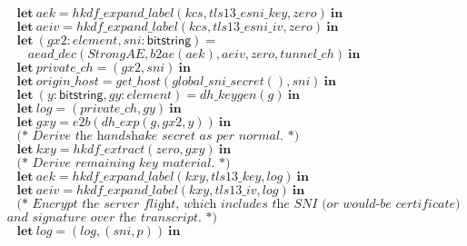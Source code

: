 \documentclass{article}
\theoremstyle{definition}
\newcommand{\kwl}[1]{\mathbf{#1}}
\newcommand{\kwt}[1]{\mathsf{#1}}
\newcommand{\var}[1]{\mathit{#1}}
\theoremstyle{definition}
\begin{document}
\begin{tabbing}
$\ \ \ \ \ \kwl{let}\ \var{aek} = \var{hkdf{\_}expand{\_}label}(\var{kcs}, \var{tls13{\_}esni{\_}key}, \var{zero})\ \kwl{in} $\\
$\ \ \ \ \ \kwl{let}\ \var{aeiv} = \var{hkdf{\_}expand{\_}label}(\var{kcs}, \var{tls13{\_}esni{\_}iv}, \var{zero})\ \kwl{in} $\\
$ $\\
$\ \ \ \ \ \kwl{let}\ (\var{gx2}{:}\var{element}, \var{sni}{:}\kwt{bitstring}) =  $\\
$\ \ \ \ \ \ \ \ \ \var{aead{\_}dec}(\var{StrongAE}, \var{b2ae}(\var{aek}), \var{aeiv}, \var{zero}, \var{tunnel{\_}ch})\ \kwl{in} $\\
$\ \ \ \ \ \kwl{let}\ \var{private{\_}ch} = (\var{gx2}, \var{sni})\ \kwl{in} $\\
$ $\\
$\ \ \ \ \ \kwl{let}\ \var{origin{\_}host} = \var{get{\_}host}(\var{global{\_}sni{\_}secret}(), \var{sni})\ \kwl{in} $\\
$ $\\
$\ \ \ \ \ \kwl{let}\ (\var{y}{:}\kwt{bitstring}, \var{gy}{:}\var{element}) = \var{dh{\_}keygen}(\var{g})\ \kwl{in} $\\
$\ \ \ \ \ \kwl{let}\ \var{log} = (\var{private{\_}ch}, \var{gy})\ \kwl{in} $\\
$\ \ \ \ \ \kwl{let}\ \var{gxy} = \var{e2b}(\var{dh{\_}exp}(\var{g}, \var{gx2}, \var{y}))\ \kwl{in} $\\
$ $\\
$\ \ \ \ \ \textit{(* Derive the handshake secret as per normal. *)} $\\
$\ \ \ \ \ \kwl{let}\ \var{kxy} = \var{hkdf{\_}extract}(\var{zero}, \var{gxy})\ \kwl{in} $\\
$ $\\
$\ \ \ \ \ \textit{(* Derive remaining key material. *)} $\\
$\ \ \ \ \ \kwl{let}\ \var{aek} = \var{hkdf{\_}expand{\_}label}(\var{kxy}, \var{tls13{\_}key}, \var{log})\ \kwl{in} $\\
$\ \ \ \ \ \kwl{let}\ \var{aeiv} = \var{hkdf{\_}expand{\_}label}(\var{kxy}, \var{tls13{\_}iv}, \var{log})\ \kwl{in} $\\
$ $\\
$\ \ \ \ \ \textit{(* Encrypt the server flight, which includes the SNI (or would-be certificate) }$\\
$\textit{        and signature over the transcript. *)} $\\
$\ \ \ \ \ \kwl{let}\ \var{log} = (\var{log}, (\var{sni}, \var{p}))\ \kwl{in} $\\

\end{tabbing}
\end{document}
